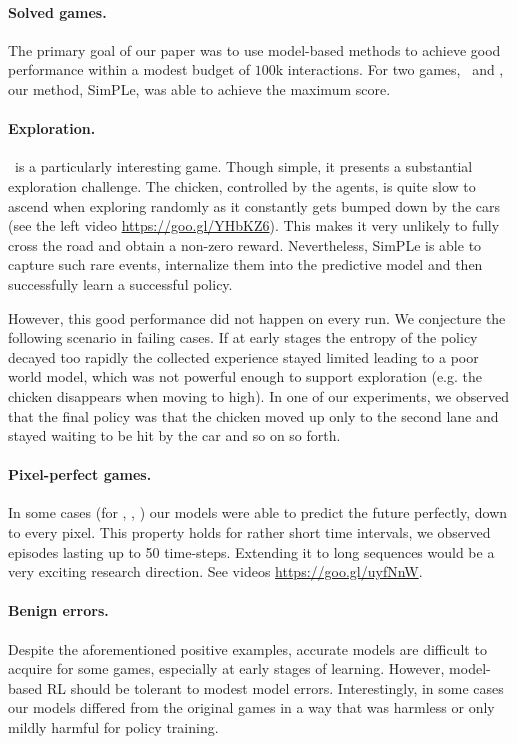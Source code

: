 \paragraph{Solved games.} 
The primary goal of our paper was to use model-based methods to achieve good performance within a modest budget of $100$k interactions. For two games, \pong\, and \freeway, our method, SimPLe, was able to achieve the maximum score.

\paragraph{Exploration.}  \freeway\, is a particularly interesting game. Though simple, it presents a substantial exploration challenge. The chicken, controlled by the agents, is quite slow to ascend when exploring randomly as it constantly gets bumped down by the cars (see the left video \url{https://goo.gl/YHbKZ6}). This makes it very unlikely to fully cross the road and obtain a non-zero reward. Nevertheless, SimPLe is able to capture such rare events, internalize them into the predictive model and then successfully learn a successful policy.

However, this good performance did not happen on every run. We conjecture the following scenario in failing cases. If at early stages the entropy of the policy decayed too rapidly the collected experience stayed limited leading to a poor world model, which was not powerful enough to support exploration (e.g. the chicken disappears when moving to high). In one of our experiments, we observed that the final policy was that the chicken moved up only to the second lane and stayed waiting to be hit by the car and so on so forth. 

\paragraph{Pixel-perfect games.} In some cases (for \pong, \freeway, \breakout) our models were able to predict the future perfectly, down to every pixel. This property holds for rather short time intervals, we observed episodes lasting up to 50 time-steps. Extending it to long sequences would be a very exciting research direction. See videos \url{https://goo.gl/uyfNnW}.

\paragraph{Benign errors.} Despite the aforementioned positive examples, accurate models are difficult to acquire for some games, especially at early stages of learning. However, model-based RL should be tolerant to modest model errors. Interestingly, in some cases our models differed from the original games in a way that was harmless or only mildly harmful for policy training.

